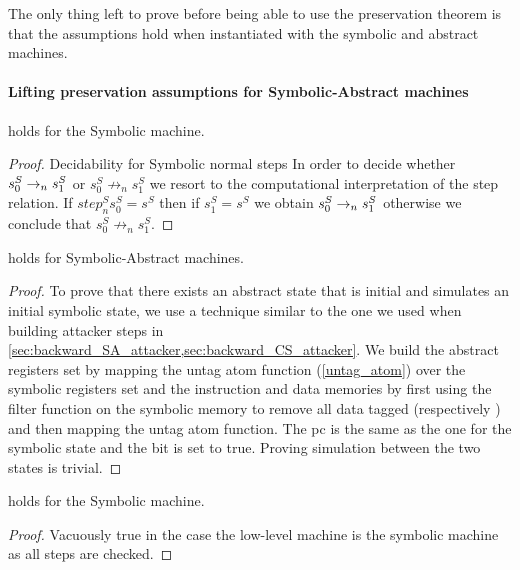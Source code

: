 The only thing left to prove before being able to use the \CFI
preservation theorem is that the
assumptions  hold when
instantiated with the symbolic and abstract machines.

\paragraph{Lifting preservation assumptions for Symbolic-Abstract machines}

\begin{lemma}
  \label{step_classic_symbolic}
   holds for the Symbolic machine.
\end{lemma}
\begin{proof}
  Decidability for Symbolic normal steps
  In order to decide whether $s^S_0\to_ns^S_1$ or
  $s^S_0 \not \to_n s^S_1$ we resort to the computational interpretation
  of the step relation. If $step^S_n s^S_0 = s^S$ then if
  $s^S_1 = s^S$ we obtain $s^S_0\to_ns^S_1$ otherwise
  we conclude that $s^S_0 \not \to_n s^S_1$.
\end{proof}
\begin{lemma}
  \label{initial_refine_SA}
   holds for Symbolic-Abstract machines.
\end{lemma}
\begin{proof}
  To prove that there exists an abstract
  state that is initial and simulates an initial symbolic state, we
  use a technique similar to the one we used when building attacker
  steps in \cref{sec:backward_SA_attacker,sec:backward_CS_attacker}.
  We build the abstract registers set by mapping the untag atom
  function (\cref{untag_atom}) over the symbolic registers set and the
  instruction and data memories by first using the filter function on
  the symbolic memory to remove all data tagged \DATAname
  (respectively \INSTRname) and then mapping the untag atom function.
  The pc is the same as the one for the symbolic state and the \ok bit
  is set to true. Proving simulation between the two states is trivial.
\end{proof}

\begin{lemma}
  \label{cfg_nocheck_SA}
   holds for the Symbolic machine.
\end{lemma}
\begin{proof}
  Vacuously true in the case the low-level machine is
  the symbolic machine as all steps are checked.
\end{proof}

